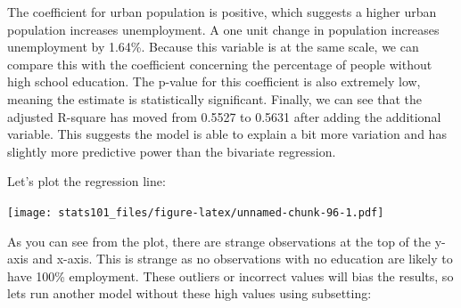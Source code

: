 \documentclass[]{article}
\newenvironment{Shaded}{\begin{snugshade}}{\end{snugshade}}
\newcommand{\DataTypeTok}[1]{\textcolor[rgb]{0.13,0.29,0.53}{#1}}
\newcommand{\DecValTok}[1]{\textcolor[rgb]{0.00,0.00,0.81}{#1}}
\newcommand{\KeywordTok}[1]{\textcolor[rgb]{0.13,0.29,0.53}{\textbf{#1}}}
\newcommand{\NormalTok}[1]{#1}
\newcommand{\OperatorTok}[1]{\textcolor[rgb]{0.81,0.36,0.00}{\textbf{#1}}}
\newcommand{\OtherTok}[1]{\textcolor[rgb]{0.56,0.35,0.01}{#1}}
\newcommand{\StringTok}[1]{\textcolor[rgb]{0.31,0.60,0.02}{#1}}
\begin{document}
The coefficient for urban population is positive, which suggests a higher urban population increases unemployment. A one unit change in population increases unemployment by 1.64\%. Because this variable is at the same scale, we can compare this with the coefficient concerning the percentage of people without high school education. The p-value for this coefficient is also extremely low, meaning the estimate is statistically significant. Finally, we can see that the adjusted R-square has moved from 0.5527 to 0.5631 after adding the additional variable. This suggests the model is able to explain a bit more variation and has slightly more predictive power than the bivariate regression.

Let's plot the regression line:

\begin{Shaded}
\end{Shaded}

\texttt{[image: stats101\_files/figure-latex/unnamed-chunk-96-1.pdf]}

As you can see from the plot, there are strange observations at the top of the y-axis and x-axis. This is strange as no observations with no education are likely to have 100\% employment. These outliers or incorrect values will bias the results, so lets run another model without these high values using subsetting:

\begin{Shaded}
\end{Shaded}
\end{document}
